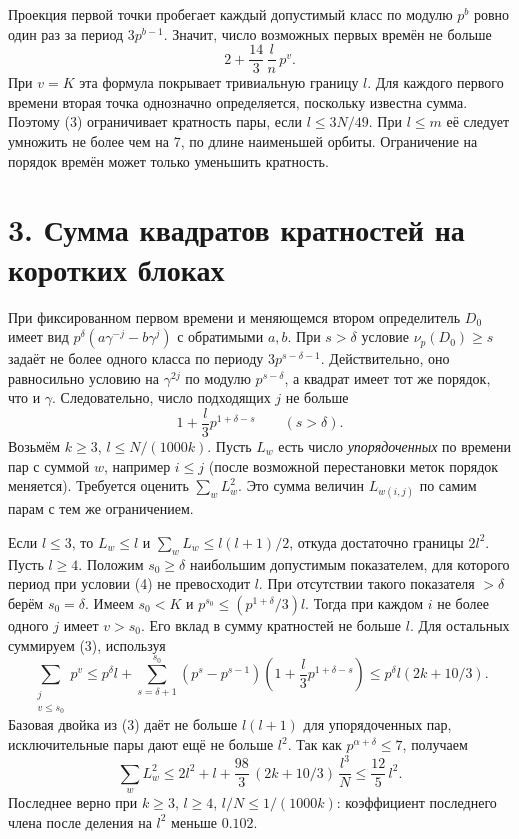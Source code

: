 \documentclass[11pt,a4paper]{article}
\newcommand{\sect}[1]{\section*{\sffamily\color{ink}#1}}
\begin{document}
Проекция первой точки пробегает каждый допустимый класс по модулю $p^b$ ровно один раз за период $3p^{b-1}$. Значит, число возможных первых времён не больше
\[
                        2+\frac{14}3\,\frac{l}{n}\,p^v.             \tag{3}
\]
При $v=K$ эта формула покрывает тривиальную границу $l$. Для каждого первого времени вторая точка однозначно определяется, поскольку известна сумма. Поэтому (3) ограничивает кратность пары, если $l\le3N/49$. При $l\le m$ её следует умножить не более чем на 7, по длине наименьшей орбиты. Ограничение на порядок времён может только уменьшить кратность.
\newpage
\sect{3. Сумма квадратов кратностей на коротких блоках}
При фиксированном первом времени и меняющемся втором определитель $D_0$ имеет вид $p^\delta(a\gamma^{-j}-b\gamma^j)$ с обратимыми $a,b$. При $s>\delta$ условие $\nu_p(D_0)\ge s$ задаёт не более одного класса по периоду $3p^{s-\delta-1}$. Действительно, оно равносильно условию на $\gamma^{2j}$ по модулю $p^{s-\delta}$, а квадрат имеет тот же порядок, что и $\gamma$. Следовательно, число подходящих $j$ не больше
\[
                1+\frac l3 p^{1+\delta-s}\qquad(s>\delta).          \tag{4}
\]
Возьмём $k\ge3$, $l\le N/(1000k)$. Пусть $L_w$ есть число \emph{упорядоченных} по времени пар с суммой $w$, например $i\le j$ (после возможной перестановки меток порядок меняется). Требуется оценить $\sum_w L_w^2$. Это сумма величин $L_{w(i,j)}$ по самим парам с тем же ограничением.

Если $l\le3$, то $L_w\le l$ и $\sum_w L_w\le l(l+1)/2$, откуда достаточно границы $2 l^2$. Пусть $l\ge4$. Положим $s_0\ge\delta$ наибольшим допустимым показателем, для которого период при условии (4) не превосходит $l$. При отсутствии такого показателя $>\delta$ берём $s_0=\delta$. Имеем $s_0<K$ и $p^{s_0}\le (p^{1+\delta}/3) l$. Тогда при каждом $i$ не более одного $j$ имеет $v>s_0$. Его вклад в сумму кратностей не больше $l$. Для остальных суммируем (3), используя
\[
 \sum_{\substack{j\\v\le s_0}}p^v
     \le p^\delta l+\sum_{s=\delta+1}^{s_0}
               (p^s-p^{s-1})\left(1+\frac l3p^{1+\delta-s}\right)
     \le p^\delta l(2k+10/3).
\]
Базовая двойка из (3) даёт не больше $l(l+1)$ для упорядоченных пар, исключительные пары дают ещё не больше $l^2$. Так как $p^{\alpha+\delta}\le7$, получаем
\[
    \sum_w L_w^2 \le 2l^2+l+
          \frac{98}{3}\,(2k+10/3)\,\frac{l^3}{N}
                         \le \frac{12}5\,l^2 .                    \tag{5}
\]
Последнее верно при $k\ge3$, $l\ge4$, $l/N\le1/(1000k)$: коэффициент последнего члена после деления на $l^2$ меньше $0.102$.
\end{document}

